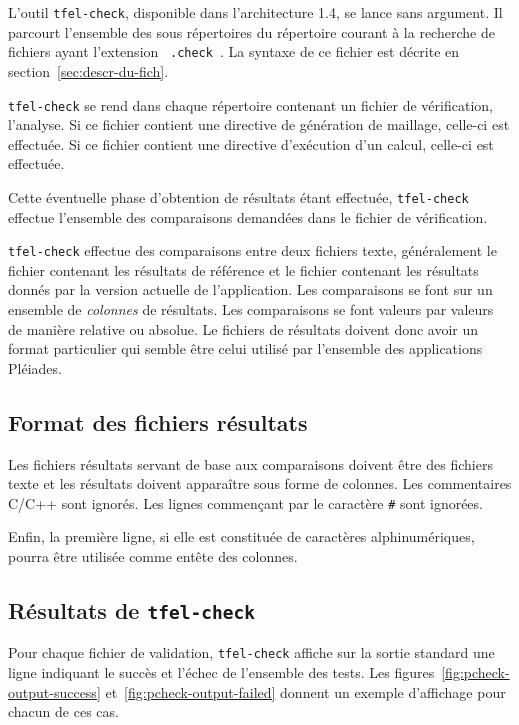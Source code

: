 \documentclass[a4paper,12pt]{article}
\newcommand{\tfel}{Pléiades}
\newcommand{\pcheck}{{\tt tfel-check}}
\begin{document}
L'outil \pcheck{}, disponible dans l'architecture 1.4, se
lance sans argument.  Il parcourt l'ensemble des sous répertoires du
répertoire courant à la recherche de fichiers ayant l'extension
\og~{\tt .check}~\fg. La syntaxe de ce fichier est décrite en
section~\ref{sec:descr-du-fich}.

\pcheck{} se rend dans chaque répertoire contenant un fichier de
vérification, l'analyse. Si ce fichier contient une directive
de génération de maillage, celle-ci est effectuée. Si ce
fichier contient une directive d'exécution d'un calcul,
celle-ci est effectuée.

Cette éventuelle phase d'obtention de résultats étant
effectuée, \pcheck{} effectue l'ensemble des comparaisons demandées
dans le fichier de vérification. 

\pcheck{} effectue des comparaisons entre deux fichiers texte,
généralement le fichier contenant les résultats de référence et le
fichier contenant les résultats donnés par la version actuelle de 
l'application. Les comparaisons se font sur un ensemble de
{\em colonnes} de résultats. Les comparaisons se font valeurs par
valeurs de manière relative ou absolue. Le fichiers de résultats
doivent donc avoir un format particulier qui semble être celui
utilisé par l'ensemble des applications \tfel{}.

\subsection{Format des fichiers résultats}

Les fichiers résultats servant de base aux comparaisons doivent être
des fichiers texte et les résultats doivent apparaître sous forme de
colonnes. Les commentaires C/C++ sont ignorés. Les lignes commençant
par le caractère {\tt \#} sont ignorées.

Enfin, la première ligne, si elle est constituée de caractères
alphinumériques, pourra être utilisée comme entête des colonnes.

\subsection{Résultats de \pcheck{}}

Pour chaque fichier de validation, \pcheck{} affiche sur la sortie
standard une ligne indiquant le succès et l'échec de l'ensemble des
tests. Les figures~\ref{fig:pcheck-output-success}
et~\ref{fig:pcheck-output-failed} donnent un exemple d'affichage
pour chacun de ces cas.
\end{document}
